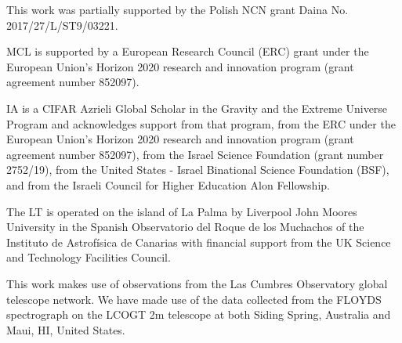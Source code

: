 \documentclass[linenumbers, twocolumn]{aastex631}
\begin{document}
This work was partially supported by the Polish NCN grant Daina
No. 2017/27/L/ST9/03221.

MCL is supported by a European Research Council (ERC) grant under the European Union's Horizon 2020 research and innovation program (grant agreement number 852097).

IA is a CIFAR Azrieli Global Scholar in the Gravity and the Extreme Universe Program and acknowledges support from that program, from the ERC under the European Union's Horizon 2020 research and innovation program (grant agreement number 852097), from the Israel Science Foundation (grant number 2752/19), from the United States - Israel Binational Science Foundation (BSF), and from the Israeli Council for Higher Education Alon Fellowship.

The LT is operated on the island of La Palma by Liverpool
John Moores University in the Spanish Observatorio del Roque
de los Muchachos of the Instituto de Astrof{\'i}sica de Canarias with
financial support from the UK Science and Technology Facilities
Council.

This work makes use of observations from the Las Cumbres Observatory
global telescope network. We have made use of the data collected from
the FLOYDS spectrograph on the LCOGT 2m telescope at both Siding Spring,
Australia and Maui, HI, United States.


{}



\end{document}
